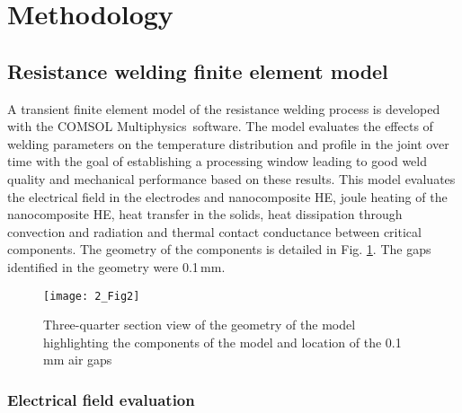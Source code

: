 \section{Methodology}

\subsection{Resistance welding finite element model}

A transient finite element model of the resistance welding process is developed with the COMSOL Multiphysics\textregistered \ software. 
The model evaluates the effects of welding parameters on the temperature distribution and profile in the joint over time with the goal of establishing a processing window leading to good weld quality and mechanical performance based on these results. 
This model evaluates the electrical field in the electrodes and nanocomposite HE, joule heating of the nanocomposite HE, heat transfer in the solids, heat dissipation through convection and radiation and thermal contact conductance between critical components. 
The geometry of the components is detailed in Fig. \ref{fig:2_Fig2}. 
The gaps identified in the geometry were \mbox{0.1\,mm}.

\begin{figure}[h!]
	\center
	\texttt{[image: 2\_Fig2]}
	\caption{Three-quarter section view of the geometry of the model highlighting the components of the model and location of the 0.1 mm air gaps \cite{Brassard2019b}}
	\label{fig:2_Fig2}
\end{figure} 

\FloatBarrier
\subsubsection{Electrical field evaluation}

